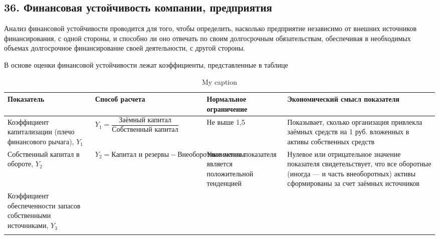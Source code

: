 \subsection*{36. Финансовая устойчивость компании, предприятия}

Анализ финансовой устойчивости проводится для того, чтобы определить, насколько предприятие независимо от внешних источников финансирования, с одной стороны, и способно ли оно отвечать по своим долгосрочным обязательствам, обеспечивая в необходимых объемах долгосрочное финансирование своей деятельности, с другой стороны.

В основе оценки финансовой устойчивости лежат коэффициенты, представленные в таблице

\begin{table}[!ht]
	\small
	\caption{My caption}
	\label{my-label}
	\setlength{\extrarowheight}{1mm}
	\begin{tabularx}{\textwidth}{|p{3cm}|K{5cm}|K{3cm}|K{4cm}|}
		\hline
		Показатель & Способ расчета &Нормальное ограничение&Экономический смысл показателя                                                                                                          \\ \hline
		Коэффициент капитализации (плечо финансового рычага), $Y_1$        & $Y_1 = \dfrac{\text{Заёмный капитал}}{\text{Собственный капитал}}$ & Не выше 1,5                                             & Показывает, сколько организация привлекла заёмных средств на 1 руб. вложенных в активы собственных средств                                                        \\ \hline
		Собственный капитал в обороте, $Y_2$                               & $Y_2 = \text{Капитал и резервы} - \text{Внеоборотные активы}$      & Увеличение показателя является положительной тенденцией & Нулевое или отрицательное значение показателя свидетельствует, что все оборотные (иногда --- и часть внеоборотных) активы сформированы за счет заёмных источников \\ \hline
		Коэффициент обеспеченности запасов собственными источниками, $Y_3$ &                                                                    &                                                         &                                                                                                                                                                   \\ \hline
		&                                                                    &                                                         &                                                                                                                                                                   \\ \hline

\end{tabularx}
\end{table}
